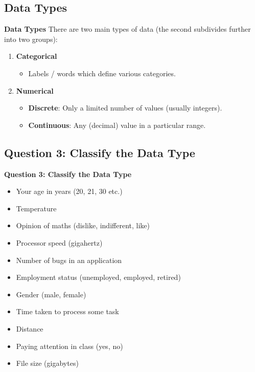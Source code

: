 \documentclass[compress]{beamer}        %
\makeatletter
\newcommand{\tcb}{\textcolor{beamer@blendedblue}}
\makeatother
\begin{document}
\subsection{Data Types}
\begin{frame}{\bf \tcb{Data Types}}
There are two main types of data (the second subdivides further into two groups):\\[0.5cm]
\begin{enumerate}[1.]\itemsep0.8cm
\item {\bf Categorical}
\begin{itemize}\itemsep0.3cm
\item Labels / words which define various categories.
\end{itemize}
\item {\bf Numerical}
\begin{itemize}\itemsep0.3cm
\item {\bf Discrete}: Only a limited number of values (usually integers).
\item {\bf Continuous}: Any (decimal) value in a particular range.
\end{itemize}
\end{enumerate}

\end{frame}


\subsection{Question 3: Classify the Data Type}
\begin{frame}{\bf \tcb{Question 3: Classify the Data Type}}

\begin{itemize}\itemsep0.2cm
\item Your age in years (20, 21, 30 etc.)
\item Temperature
\item Opinion of maths (dislike, indifferent, like)
\item Processor speed (gigahertz)
\item Number of bugs in an application
\item Employment status (unemployed, employed, retired)
\item Gender (male, female)
\item Time taken to process some task
\item Distance
\item Paying attention in class (yes, no)
\item File size (gigabytes)
\end{itemize}

\end{frame}
\end{document}
